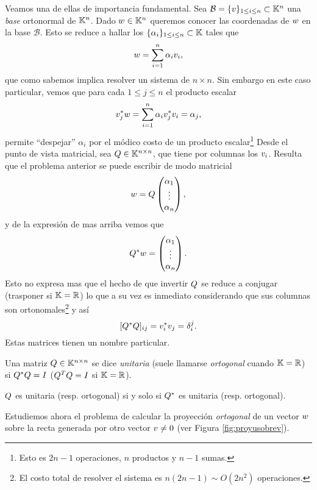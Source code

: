 Veamos una de ellas de importancia fundamental. Sea $\mathcal{B}=\{\vb\}_{1\le i\le n}\subset \K^n$ una \emph{base} ortonormal de $\mathbb K^n$. Dado $\wb\in \K^n$ queremos conocer las coordenadas de $\wb$ en la base $\mathcal{B}$. Esto se reduce a hallar los  $\{\alpha_i\}_{1\le i\le n}\subset \mathbb K$ tales que
\begin{equation}
\label{eq:escritura_ort}
\wb=\sum_{i=1}^n\alpha_i\vb_i,
\end{equation}
que como sabemos implica resolver un sistema de $n\times n$. Sin embargo en este caso particular, vemos que para cada $1\le j\le n$ el producto escalar
\begin{equation}
\label{eq:proyecciones}
\vb_j^*\wb=\sum_{i=1}^n\alpha_i\vb_j^*\vb_i=\alpha_j,
\end{equation}
permite ``despejar'' $\alpha_i$ por el módico costo de un producto escalar\footnote{Esto es $2n-1$ operaciones, $n$ productos y $n-1$ sumas.}
Desde el punto de vista matricial, sea $\Qb\in \K^{n\times n}$, que tiene por columnas los $\vb_i$. Resulta que el problema anterior se puede escribir de modo matricial
$$
\wb=\Qb\begin{pmatrix}
        \alpha_1\\
        \vdots\\
        \alpha_n
       \end{pmatrix},
$$
y de la expresión de mas arriba vemos que
$$
\Qb^*\wb=\begin{pmatrix}
        \alpha_1\\
        \vdots\\
        \alpha_n
       \end{pmatrix}.
$$
Esto no expresa mas que el hecho de que invertir $\Qb$ se reduce a conjugar (trasponer si $\mathbb K=\mathbb R$) lo que a su vez es inmediato considerando que sus columnas son ortonomales\footnote{El costo total de resolver el sistema es $n(2n-1)\sim O(2n^2)$ operaciones. } y así
$$
[\Qb^*\Qb]_{ij}=\vb_i^*\vb_j=\delta_i^j.
$$
Estas matrices tienen un nombre particular.
\begin{defi}
\label{def:de_unitaria}
 Una matriz $\Qb\in \K^{n\times n}$ se dice \emph{unitaria} (suele llamarse \emph{ortogonal} cuando $\mathbb K=\mathbb R$) si
 $\Qb^*\Qb=\Ib$ ($\Qb^T\Qb=\Ib$ si $\mathbb K=\mathbb R$).
\end{defi}
\begin{rem}
$\Qb$ es unitaria (resp. ortogonal) si y solo si $\Qb^*$ es unitaria (resp. ortogonal).
\end{rem}
Estudiemos ahora el problema de calcular la proyección \emph{ortogonal} de un vector $\wb$ sobre la recta generada por otro vector $\vb\neq \cero$ (ver Figura \ref{fig:proyusobrev}).

